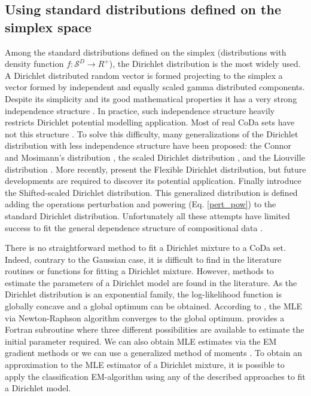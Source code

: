 \documentclass[preprint, review, 3p, authoryear]{elsarticle}
\begin{document}

\subsection{Using standard distributions defined on the simplex space}
\label{simplex_section}

\noindent Among the standard distributions defined on the simplex (distributions with density function $f: \mathcal{S}^D\rightarrow R^+$), the Dirichlet distribution is the most widely used. 
A Dirichlet distributed random vector is formed projecting to the simplex a vector formed by independent and equally scaled gamma distributed components.
Despite its simplicity and its good mathematical properties it has a very strong independence structure \citep{aitchison1986statistical}. 
In practice, such independence structure heavily restricts Dirichlet potential modelling application. Most of real CoDa sets have
not this structure \citep{aitchison1986statistical}. To solve this difficulty, many generalizations of the Dirichlet distribution with less
independence structure have been proposed: the Connor and Mosimann's distribution
\citep{Connor:1969}, the scaled Dirichlet distribution \citep{aitchison1986statistical},  and the Liouville distribution \citep{rayens1994dependence}.  More recently, \cite{ongaro2008new} present the Flexible Dirichlet distribution, but future
developments are required to discover its potential application. Finally \cite{monti2011shifted} introduce the Shifted-scaled Dirichlet distribution. This generalized distribution is defined adding the operations
perturbation and powering (Eq. \ref{pert_pow}) to the standard Dirichlet distribution. Unfortunately all these attempts
have limited success to fit the general dependence structure of compositional data \citep{mateu2013normal}.

There is no straightforward method to fit a Dirichlet mixture to a CoDa set. Indeed, contrary to the Gaussian case,
it is difficult to find in the literature routines or functions for fitting a Dirichlet mixture. However, methods to estimate the parameters of a Dirichlet model are found in the literature. As the Dirichlet distribution is an exponential family, the log-likelihood function is globally concave and a global optimum can be obtained. According to \cite{ng2011dirichlet}, the MLE via Newton-Raphson algorithm converges to the global optimum. \cite{narayanan1991algorithm} provides a Fortran subroutine where three different possibilities are available to estimate the initial parameter required.
We can also obtain MLE estimates via the EM gradient methods \citep{ng2011dirichlet} or we can use a generalized method of moments
\citep{hansen1982large}.  To obtain an approximation to the MLE estimator of a Dirichlet mixture, it is possible to apply the classification EM-algorithm \citep[CEM algorithm,][]{celeux1992classification} using any of the described approaches to fit a Dirichlet model.
\end{document}
